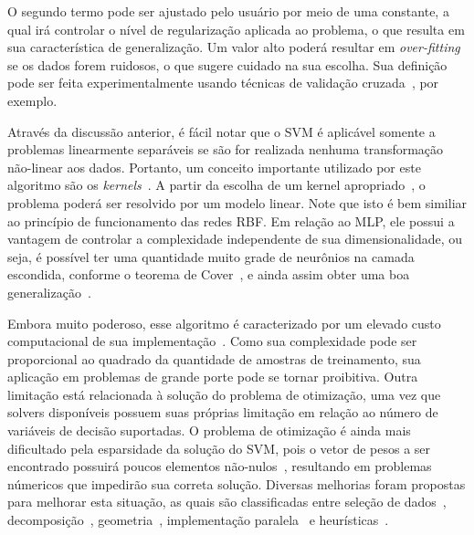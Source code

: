 \documentclass[conference]{IEEEtran}
\begin{document}
	O segundo termo pode ser ajustado pelo usuário por meio de uma constante, a qual irá controlar o nível de regularização aplicada ao problema, o que resulta em sua característica de generalização. Um valor alto poderá resultar em \textit{over-fitting} se os dados forem ruidosos, o que sugere cuidado na sua escolha. Sua definição pode ser feita experimentalmente usando técnicas de validação cruzada~\cite{arlot2010survey}, por exemplo.
	
	Através da discussão anterior, é fácil notar que o SVM é aplicável somente a problemas linearmente separáveis se são for realizada nenhuma transformação não-linear aos dados. Portanto, um conceito importante utilizado por este algoritmo são os \textit{kernels}~\cite{shawetaylor2004kernel}. A partir da escolha de um kernel apropriado~\cite{mercer1909xvi,courant89}, o problema poderá ser resolvido por um modelo linear. Note que isto é bem similiar ao princípio de funcionamento das redes RBF. Em relação ao MLP, ele possui a vantagem de controlar a complexidade independente de sua dimensionalidade, ou seja, é possível ter uma quantidade muito grade de neurônios na camada escondida, conforme o teorema de Cover~\cite{cover1965geometrical}, e ainda assim obter uma boa generalização~\cite{scholkopf2018learning}.
	
%	
	
 	Embora muito poderoso, esse algoritmo é caracterizado por um elevado custo computacional de sua implementação~\cite{bottou2007support}. Como sua complexidade pode ser proporcional ao quadrado da quantidade de amostras de treinamento, sua aplicação em problemas de grande porte pode se tornar proibitiva. Outra limitação está relacionada à solução do problema de otimização, uma vez que solvers disponíveis possuem suas próprias limitação em relação ao número de variáveis de decisão suportadas. O problema de otimização é ainda mais dificultado pela esparsidade da solução do SVM, pois o vetor de pesos a ser encontrado possuirá poucos elementos não-nulos~\cite{haykin2007neural}, resultando em problemas númericos que impedirão sua correta solução. Diversas melhorias foram propostas para melhorar esta situação, as quais são classificadas entre seleção de dados~\cite{wang2005training}, decomposição~\cite{dong2005fast}, geometria~\cite{zeng2008geometric}, implementação paralela~\cite{graf2004parallel} e heurísticas~\cite{decoste2000alpha}.
 	
\end{document}
